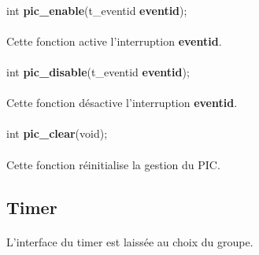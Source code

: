 \documentclass[10pt,a4wide]{article}
\begin{document}
\paragraph{}

\hspace{1.5cm}int \textbf{pic\_enable}(t\_eventid \textbf{eventid});

\paragraph{}

Cette fonction active l'interruption \textbf{eventid}.

\paragraph{}

\hspace{1.5cm}int \textbf{pic\_disable}(t\_eventid \textbf{eventid});

\paragraph{}

Cette fonction d\'esactive l'interruption \textbf{eventid}.

\paragraph{}

\hspace{1.5cm}int \textbf{pic\_clear}(void);

\paragraph{}

Cette fonction r\'einitialise la gestion du PIC.

\subsection{Timer}

\paragraph{}

L'interface du timer est laiss\'ee au choix du groupe.

\paragraph{}
\end{document}
